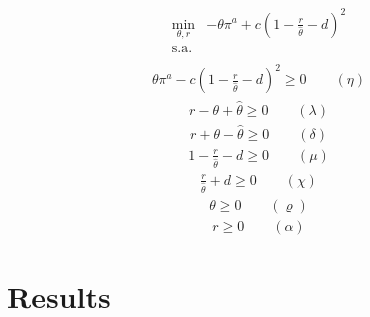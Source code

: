\documentclass[a4paper,fleqn]{cas-dc}
\begin{document}
\begin{equation}
\begin{array}{rrclcl}
\displaystyle \min_{\theta,r} & -\theta \pi^a + c(1-\frac{r}{\hat{\theta}}-d)^2 \\\textrm{s.a.} \label{fo:social2}\\
\end{array}
\end{equation}
\begin{equation}
\begin{array}{rrclcl}
\displaystyle \theta \pi^a - c(1-\frac{r}{\hat{\theta}}-d)^2 \geq 0 \qquad (\eta)\label{social1:r12}
\end{array}
\end{equation}
\begin{equation}
\begin{array}{rrclcl}
\displaystyle r - \theta + \hat{\theta} \geq 0 \qquad (\lambda)\label{social1:r22}
\end{array}
\end{equation}
\begin{equation}
\begin{array}{rrclcl}
\displaystyle r + \theta - \hat{\theta} \geq 0 \qquad (\delta)\label{social1:r23}
\end{array}
\end{equation}
\begin{equation}
\begin{array}{rrclcl}
1-\frac{r}{\hat{\theta}}-d \geq 0 \qquad (\mu)\label{social1:r26}
\end{array}
\end{equation}
\begin{equation}
\begin{array}{rrclcl}
\frac{r}{\hat{\theta}} + d \geq 0 \qquad (\chi)\label{social1:r27}
\end{array}
\end{equation}
\begin{equation}
\begin{array}{rrclcl}
\theta \geq 0 \qquad (\varrho)\label{social1:r24}
\end{array}
\end{equation}
\begin{equation}
\begin{array}{rrclcl}
r \geq 0 \qquad (\alpha)\label{social1:r25}
\end{array}
\end{equation}

\section{Results}\label{sec:results}
\end{document}
